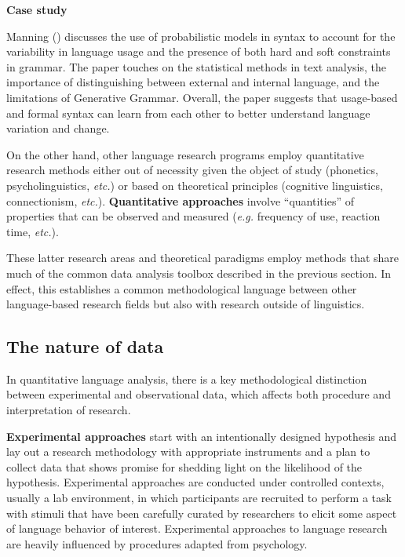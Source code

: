 \documentclass[
  letterpaper,
  krantz1]{latex/krantz-mod}
\theoremstyle{definition}
\theoremstyle{definition}
\theoremstyle{remark}
\begin{document}
\begin{tcolorbox}[enhanced jigsaw, toprule=.15mm, breakable, colback=white, arc=.35mm, left=2mm, colframe=quarto-callout-color-frame, opacityback=0, bottomrule=.15mm, rightrule=.15mm, leftrule=.75mm]

\textbf{ Case study}

Manning () discusses the use of
probabilistic models in syntax to account for the variability in
language usage and the presence of both hard and soft constraints in
grammar. The paper touches on the statistical methods in text analysis,
the importance of distinguishing between external and internal language,
and the limitations of Generative Grammar.
Overall, the paper suggests that usage-based and formal syntax can learn
from each other to better understand language variation and change.

\end{tcolorbox}

On the other hand, other language research programs employ quantitative
research methods either out of necessity given the object of study
(phonetics, 
psycholinguistics, \emph{etc.}) or based on theoretical principles
(cognitive linguistics,
 connectionism, \emph{etc.}).
\textbf{Quantitative approaches} involve
``quantities'' of properties that can be observed and measured
(\emph{e.g.} frequency of use, reaction time, \emph{etc.}).

These latter research areas and theoretical paradigms employ methods
that share much of the common data analysis toolbox described in the
previous section. In effect, this establishes a common methodological
language between other language-based research fields but also with
research outside of linguistics.

\subsection{The nature of data}\label{the-nature-of-data}

In quantitative language analysis,
there is a key methodological distinction between experimental and
observational data, which affects both procedure and interpretation of
research.

\textbf{Experimental approaches} start
with an intentionally designed hypothesis and lay out
a research methodology with appropriate instruments and a plan to
collect data that shows promise for shedding light on the likelihood of
the hypothesis. Experimental approaches are conducted under controlled
contexts, usually a lab environment, in which participants are recruited
to perform a task with stimuli that have been carefully curated by
researchers to elicit some aspect of language behavior of interest.
Experimental approaches to language research are heavily influenced by
procedures adapted from psychology.
\end{document}
